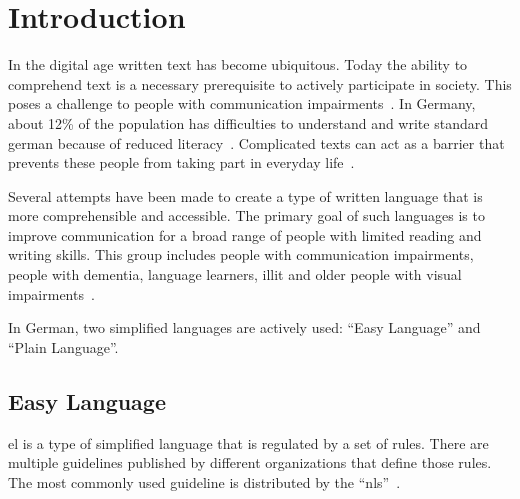 \chapter{Introduction}\label{ch:introduction}

In the digital age written text has become ubiquitous. %
Today the ability to comprehend text is a necessary prerequisite to actively participate in society. %
This poses a challenge to people with communication impairments~\autocite{easyLanguageBook}.
In Germany, about 12\% of the population has difficulties to understand and write standard german because of reduced literacy~\autocite{schomacker2023data}.
Complicated texts can act as a barrier that prevents these people from taking part in everyday life~\autocite{easyLanguageBook}.

Several attempts have been made to create a type of written language that is more comprehensible and accessible.
The primary goal of such languages is to improve communication for a broad range of people with limited reading and writing skills.
This group includes people with communication impairments, people with dementia, language learners, \gls{illit} and older people with visual impairments~\autocite{easyLanguageBook}.

In German, two simplified languages are actively used: \enquote{Easy Language} and \enquote{Plain Language}.



\section{Easy Language}\label{sec:el}

\gls{el} is a type of simplified language that is regulated by a set of rules.
There are multiple guidelines published by different organizations that define those rules.
The most commonly used guideline is distributed by the \enquote{\gls{nls}}~\autocite{netzwerkLS, easyLanguageBook}.

